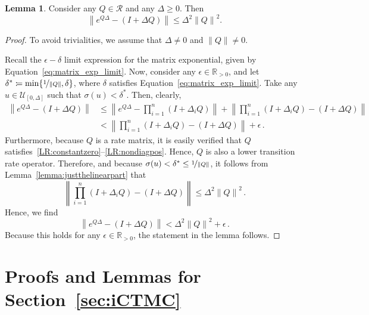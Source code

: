 \documentclass[10pt]{paper}
\theoremstyle{definition}
\newtheorem{lemma}[theorem]{Lemma}
\newcommand{\reals}{\mathbb{R}}
\newcommand{\realspos}{\reals_{>0}}
\newcommand{\norm}[1]{\left\lVert #1 \right\rVert}
\newcommand{\coloneqq}{:\!=}
\begin{document}
\begin{lemma}\label{lemma:linearpartofexponential}
Consider any $Q\in\mathcal{R}$ and any $\Delta\geq0$. Then
\begin{equation*}
\norm{e^{Q\Delta}-(I+\Delta Q)}\leq
\Delta^2\norm{Q}^2.
\end{equation*}
\end{lemma}
\begin{proof}
To avoid trivialities, we assume that $\Delta\neq 0$ and $\norm{Q}\neq 0$. 

Recall the $\epsilon-\delta$ limit expression for the matrix exponential, given by Equation~\eqref{eq:matrix_exp_limit}. Now, consider any $\epsilon\in\realspos$, and let $\delta^*\coloneqq\min\{\nicefrac{1}{\norm{Q}},\delta\}$, where $\delta$ satisfies Equation~\eqref{eq:matrix_exp_limit}. Take any $u\in\mathcal{U}_{[0,\Delta]}$ such that $\sigma(u)<\delta^*$. Then, clearly,
\begin{align*}
\norm{e^{Q\Delta}-(I+\Delta Q)} &\leq \norm{e^{Q\Delta} - \prod_{i=1}^n(I+\Delta_iQ)} + \norm{\prod_{i=1}^n(I+\Delta_iQ) - (I+\Delta Q)} \\
 &< \norm{\prod_{i=1}^n(I+\Delta_iQ) - (I+\Delta Q)} + \epsilon\,.
\end{align*}
Furthermore, because $Q$ is a rate matrix, it is easily verified that $Q$ satisfies~\ref{LR:constantzero}--\ref{LR:nondiagpos}. Hence, $Q$ is also a lower transition rate operator. Therefore, and because $\sigma(u)<\delta^*\leq\nicefrac{1}{\norm{Q}}$, it follows from Lemma~\ref{lemma:justthelinearpart} that
\begin{equation*}
\norm{\prod_{i=1}^n(I+\Delta_iQ) - (I+\Delta Q)} \leq \Delta^2\norm{Q}^2\,.
\end{equation*}
Hence, we find
\begin{equation*}
\norm{e^{Q\Delta}-(I+\Delta Q)} < \Delta^2\norm{Q}^2 + \epsilon\,.
\end{equation*}
Because this holds for any $\epsilon\in\realspos$, the statement in the lemma  follows.
\end{proof}

\section{Proofs and Lemmas for Section~\ref{sec:iCTMC}}
\end{document}

